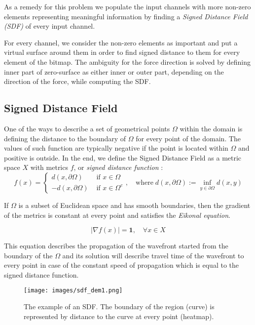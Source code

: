 As a remedy for this problem we populate the input channels with more non-zero elements representing meaningful information by finding a \emph{Signed Distance Field (SDF)} of every input channel\cite{bibl:sdf}.
\medskip

For every channel, we consider the non-zero elements as important and put a virtual surface around them in order to find signed distance to them for every element of the bitmap.
The ambiguity for the force direction is solved by defining inner part of zero-surface as either inner or outer part, depending on the direction of the force, while computing the SDF.
\medskip

\subsection{Signed Distance Field}

One of the ways to describe a set of geometrical points $\Omega$ within the domain is defining the distance to the boundary of $\Omega$ for every point of the domain. 
The values of such function are typically negative if the point is located within $\Omega$ and positive is outside.
In the end, we define the Signed Distance Field as a metric space $X$ with metrics $f$, or \emph{signed distance function} :    
\[ 
f(x) = 
	\begin{cases}
			d(x, \partial \Omega) & \mbox{ if } x\in\Omega  \\
			-d(x, \partial \Omega) & \mbox{ if } x\in\Omega^c 
	\end{cases} 
	, \quad \mathrm{where} \; d(x, \partial \Omega) := \inf_{y \in \partial \Omega}d(x, y)
\]

If $\Omega$ is a subset of Euclidean space and has smooth boundaries, then the gradient of the metrics is constant at every point and satisfies the \emph{Eikonal equation}.
\medskip

\[
 |\nabla f(x)| = \mathbf{1}, \quad \forall x \in X
\]

This equation describes the propagation of the wavefront started from the boundary of the $\Omega$ and its solution will describe travel time of the wavefront to every point in case of the constant speed of propagation which is equal to the signed distance function.
\begin{figure}
	\centering
	\texttt{[image: images/sdf\_dem1.png]}
	\label{fig:sdf_ex}
	\caption{The example of an SDF. The boundary of the region (curve) is represented by distance to the curve at every point (heatmap).}
\end{figure}
\medskip

